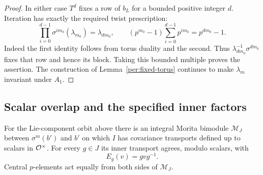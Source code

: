 \begin{proof}
In either case $T^d$ fixes a row of $b_L$ for a bounded positive
integer $d$.  Iteration has exactly the required twist prescription:
\[
 \prod_{i=0}^{d-1}\sigma^{i m_0}(\lambda_{m_0})
       =\lambda_{d m_0},\qquad
 (p^{m_0}-1)\sum_{i=0}^{d-1}p^{i m_0}=p^{d m_0}-1.
\]
Indeed the first identity follows from torus duality and the second.
Thus $\lambda_{d m_0}^{-1}\sigma^{d m_0}$ fixes that row and hence
its block.  Taking this bounded multiple proves the assertion.
The construction of Lemma~\ref{per:fixed-torus} continues to make
$\lambda_m$ invariant under $A_1$.
\end{proof}

\subsection{Scalar overlap and the specified inner factors}

\begin{lemma}
\label{per:scalar-overlap}
For the Lie-component orbit above there is an integral Morita
bimodule $\mathcal M_J$ between $\sigma^m(b')$ and $b'$ on which
$I$ has covariance transports defined up to scalars in $\mathcal O^\times$.
For every $g\in J$ its inner transport agrees, modulo scalars, with
\[
 E_g(v)=gvg^{-1}.
\]
Central $p$-elements act equally from both sides of $\mathcal M_J$.
\end{lemma}

